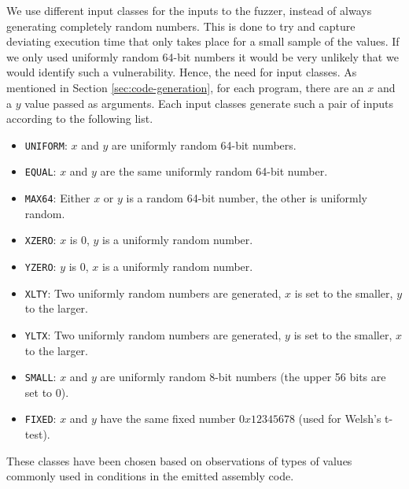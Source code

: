 We use different input classes for the inputs to the fuzzer, instead of always generating completely random numbers. 
This is done to try and capture deviating execution time that only takes place for a small sample of the values.
If we only used uniformly random 64-bit numbers it would be very unlikely that we would identify such a vulnerability.
Hence, the need for input classes.
As mentioned in Section \ref{sec:code-generation}, for each program, there are an $x$ and a $y$ value passed as arguments. 
Each input classes generate such a pair of inputs according to the following list.
\begin{itemize}
    \setlength\itemsep{-0.6em}
    \item \texttt{UNIFORM}: $x$ and $y$ are uniformly random 64-bit numbers.
    \item \texttt{EQUAL}:  $x$ and $y$ are the same uniformly random 64-bit number.
    \item \texttt{MAX64}: Either $x$ or $y$ is a random 64-bit number, the other is uniformly random.
    \item \texttt{XZERO}: $x$ is 0, $y$ is a uniformly random number.
    \item \texttt{YZERO}: $y$ is 0, $x$ is a uniformly random number.
    \item \texttt{XLTY}: Two uniformly random numbers are generated, $x$ is set to the smaller, $y$ to the larger.
    \item \texttt{YLTX}: Two uniformly random numbers are generated, $y$ is set to the smaller, $x$ to the larger.
    \item \texttt{SMALL}: $x$ and $y$ are uniformly random 8-bit numbers (the upper 56 bits are set to 0).
    \item \texttt{FIXED}: $x$ and $y$ have the same fixed number $0x12345678$ (used for Welsh's t-test).
\end{itemize}
These classes have been chosen based on observations of types of values commonly used in conditions in the emitted assembly code.

